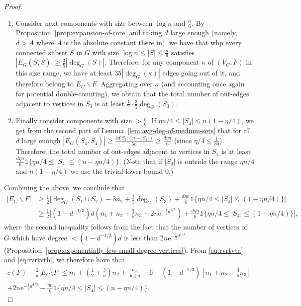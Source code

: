 \documentclass[11pt]{article}
\theoremstyle{plain}
\newcommand{\emm}{\mathrm{e}}
\newcommand{\1}{\mathbb{1}}
\begin{document}
\begin{proof}
\begin{enumerate}
        \item Consider next components with size between \(\log n\) and \(\tfrac n6\). By Proposition~\ref{prop:expansion-of-core} and taking $d$ large enough (namely, $d>A$ where $A$ is the absolute constant there in), we have that  whp every connected  subset \(S\)  in $G$ with size $\log n\leq |S|\leq \tfrac{n}{6}$ satisfies \(|E_G(S,\overline{S})|\geq\tfrac 35|\deg_G(S)|\). Therefore, for any component $\kappa$ of \((V_C,F)\) in this size range, we have at least $35|\deg_G(\kappa)|$ edges going out of it, and therefore belong to $E_C\backslash F$. Aggregating over $\kappa$ (and accounting once again for potential double-counting), we obtain that the total number of out-edges adjacent to vertices in \(S_3\) is at least \(\tfrac{1}{2}\cdot \tfrac{3}{5}\deg_G(S_3)\).

        \item Finally consider components with size $>\tfrac{n}{6}$. If \(\eta n/4  \leq |S_4|\leq n(1-\eta / 4) \), we get from the second part of Lemma~\ref{lem:avg-deg-of-medium-sets} that for all \(d\) large enough \(|E_G(S_4,\overline S_4)|\geq \frac{4d|S_4|(n-|S_4|)}{5n}\geq\frac{d\eta n}{6}\) (since \(\eta/4\leq \tfrac{1}{30}\)).  Therefore, the total number of out-edges adjacent to vertices in \(S_4\) is at least $\frac{d\eta n}{6}\1\{\eta n/4\leq |S_4|\leq (n-\eta n/4)\}$. (Note that if $|S_4|$ is outside the range $\eta n/4$ and  $n(1-\eta / 4)$ we use the trivial lower bound 0.)
\end{enumerate}
    Combining the above, we conclude that
    \begin{align}
    |E_C\backslash F|&\geq \tfrac{1}{2}\big[\deg_G(S_1\cup S_2) - 3n_2 + \tfrac{3}{5}\deg_G(S_3) + \tfrac{d\eta n}{6}\1\{\eta n/4\leq |S_4|\leq (1-\eta n/4)\}\big]\nonumber\\
    &\geq \tfrac{1}{2}\big[(1-d^{-1/3})d (n_1+n_2+\tfrac{3}{5}n_3-2n \emm^{-\frac12d^{1/3}})+\tfrac{d\eta n}{6}\1\{\eta n/4\leq |S_4|\leq (1-\eta n/4)\}\big],\label{eq:rvrtvtb}
    \end{align}
    where the second inequality follows from the fact that the number of  vertices of $G$ which have degree $<(1-d^{-1/3})d$ is less than $2n \emm^{-\frac12d^{1/3}}$ (Proposition~\ref{prop:exponentially-few-small-degree-vertices}).
    From \eqref{eq:rvrtvta} and \eqref{eq:rvrtvtb}, we therefore have that
    \begin{multline*}
        c(F) - \tfrac{2}{d}|E_C\setminus F| \leq 
        n_1 + (\tfrac12+\tfrac 3d) n_2 + \frac{n_3}{\log n} + 6 - (1-d^{-1/3})\left[ n_1 + n_2 + \tfrac{3}{5}n_3 \right] \\ + 2n\emm^{-\frac{1}{2}d^{1/3}} - \tfrac{\eta n}{6}\1\{\eta n/4\leq |S_4|\leq (n-\eta n/4)\}.

\end{multline*}
\end{proof}
\end{document}
